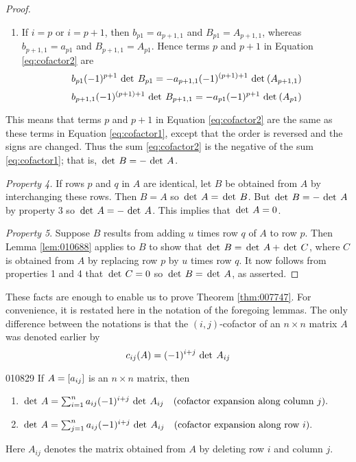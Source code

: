 \begin{proof}
\begin{enumerate}[label={\alph*.}]
\item If $i = p$ or $i = p + 1$, then $b_{p1} = a_{p+1,1}$ and $B_{p1} = A_{p+1,1}$, whereas $b_{p+1,1} = a_{p1}$ and $B_{p+1,1} = A_{p1}$. Hence terms $p$ and $p + 1$ in Equation \ref{eq:cofactor2} are
\begin{equation*}
b_{p1}(-1)^{p+1}\thinspace\operatorname{det \medspace} B_{p1} = -a_{p+1,1}(-1)^{(p+1)+1} \thinspace\operatorname{det\medspace}(A_{p+1,1})
\end{equation*}
\begin{equation*}
b_{p+1,1}(-1)^{(p+1)+1}\thinspace\operatorname{det \medspace} B_{p+1,1} = -a_{p1}(-1)^{p+1} \thinspace\operatorname{det\medspace}(A_{p1})
\end{equation*}
\end{enumerate}

This means that terms $p$ and $p + 1$ in Equation \ref{eq:cofactor2} are the same as these terms in Equation \ref{eq:cofactor1}, except that the order is reversed and the signs are changed. Thus the sum \ref{eq:cofactor2} is the negative of the sum \ref{eq:cofactor1}; that is, $\thinspace\operatorname{det \medspace}B = -\thinspace\operatorname{det \medspace}A$.


\textit{Property 4.} If rows $p$ and $q$ in $A$ are identical, let $B$ be obtained from $A$ by interchanging these rows. Then $B = A$ so $\thinspace\operatorname{det \medspace}A = \thinspace\operatorname{det \medspace}B$. But $\thinspace\operatorname{det \medspace}B = -\thinspace\operatorname{det \medspace}A$ by property 3 so $\thinspace\operatorname{det \medspace}A = -\thinspace\operatorname{det \medspace}A$. This implies that $\thinspace\operatorname{det \medspace}A = 0$.


\textit{Property 5}. Suppose $B$ results from adding $u$ times row $q$ of $A$ to row $p$. Then Lemma \ref{lem:010688} applies to $B$ to show that $\thinspace\operatorname{det \medspace}B = \thinspace\operatorname{det \medspace}A + \thinspace\operatorname{det \medspace}C$, where $C$ is obtained from $A$ by replacing row $p$ by $u$ times row $q$. It now follows from properties 1 and 4 that $\thinspace\operatorname{det \medspace}C = 0$ so $\thinspace\operatorname{det \medspace}B = \thinspace\operatorname{det \medspace}A$, as asserted.
\end{proof}

These facts are enough to enable us to prove Theorem \ref{thm:007747}.
 For convenience, it is restated here in the notation of the foregoing 
lemmas. The only difference between the notations is that the $(i, j)$-cofactor of an $n \times n$ matrix $A$ was denoted earlier by
\begin{equation*}
c_{ij}(A) = (-1)^{i+j} \thinspace\operatorname{det \medspace} A_{ij}
\end{equation*}

\begin{theorem}{}{010829}
If $A = \left[ a_{ij} \right]$ is an $n \times n$ matrix, then


\begin{enumerate}
\item $\thinspace\operatorname{det \medspace} A = \sum_{i=1}^n a_{ij} (-1)^{i+j} \thinspace\operatorname{det \medspace}A_{ij} \quad (\mbox{cofactor expansion along column } j).$


\item $\thinspace\operatorname{det \medspace} A = \sum_{j=1}^n a_{ij} (-1)^{i+j} \thinspace\operatorname{det \medspace}A_{ij} \quad (\mbox{cofactor expansion along row } i).$


\end{enumerate}

Here $A_{ij}$ denotes the matrix obtained from $A$ by deleting row $i$ and column $j$.
\end{theorem}

